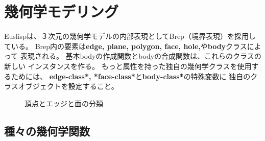 \section{\label{Geometry}幾何学モデリング}

Euslispは、３次元の幾何学モデルの内部表現として{\emx Brep}（境界表現）を採用している。
Brep内の要素は{\bf edge, plane, polygon, face, hole,}や{\bf body}クラスによって
表現される。
基本bodyの作成関数とbodyの合成関数は、これらのクラスの新しい
インスタンスを作る。
もっと属性を持った独自の幾何学クラスを使用するためには、
{\bf *edge-class*, *face-class*}と{\bf *body-class*}の特殊変数に
独自のクラスオブジェクトを設定すること。

\begin{figure}
\begin{center}
\end{center}
\caption{頂点とエッジと面の分類}
\end{figure}

\subsection{種々の幾何学関数}

